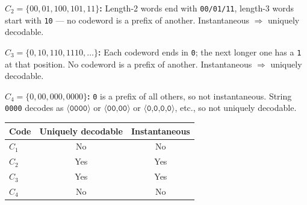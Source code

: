\documentclass[11pt,a4paper]{article}
\begin{document}
\textbf{$C_2=\{00,01,100,101,11\}$:} Length-2 words end with \texttt{00/01/11}, length-3 words start with \texttt{10} — no codeword is a prefix of another. Instantaneous $\Rightarrow$ uniquely decodable.

\textbf{$C_3=\{0,10,110,1110,\ldots\}$:} Each codeword ends in \texttt{0}; the next longer one has a \texttt{1} at that position. No codeword is a prefix of another. Instantaneous $\Rightarrow$ uniquely decodable.

\textbf{$C_4=\{0,00,000,0000\}$:} \texttt{0} is a prefix of all others, so not instantaneous.
String \texttt{0000} decodes as $\langle\texttt{0000}\rangle$ or $\langle\texttt{00,00}\rangle$ or $\langle\texttt{0,0,0,0}\rangle$, etc., so not uniquely decodable.

\bigskip
\begin{center}
\begin{tabular}{lcc}
\hline
Code & Uniquely decodable & Instantaneous \\
\hline
$C_1$ & No  & No  \\
$C_2$ & Yes & Yes \\
$C_3$ & Yes & Yes \\
$C_4$ & No  & No  \\
\hline
\end{tabular}
\end{center}
\end{document}
